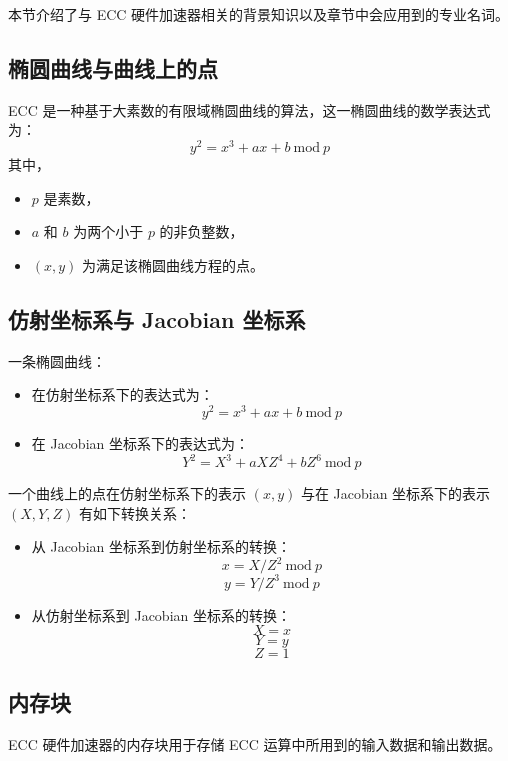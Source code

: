 \documentclass[main\_\_CN.tex]{subfiles}
\begin{document}
本节介绍了与 ECC 硬件加速器相关的背景知识以及章节中会应用到的专业名词。

\subsection{椭圆曲线与曲线上的点}

ECC 是一种基于大素数的有限域椭圆曲线的算法，这一椭圆曲线的数学表达式为：
\[
{y}^{2} = {x}^{3} + {ax} + b \ \textrm{mod}\ p
\]
其中，
\begin{itemize}
    \item $p$ 是素数，
    \item $a$ 和 $b$ 为两个小于 $p$ 的非负整数，
    \item $(x, y)$ 为满足该椭圆曲线方程的点。
\end{itemize}

\subsection{仿射坐标系与 Jacobian 坐标系}

一条椭圆曲线：
\begin{itemize}
    \item 在仿射坐标系下的表达式为：
    \[
    {y}^{2} = {x}^{3} + {ax} + b \ \textrm{mod}\ p
    \]
    \item 在 Jacobian 坐标系下的表达式为：
    \[
    {Y}^{2} = {X}^{3} + {aXZ}^{4} + {bZ}^{6} \ \textrm{mod}\ p
    \]
\end{itemize}

一个曲线上的点在仿射坐标系下的表示 $(x, y)$ 与在 Jacobian 坐标系下的表示 $(X, Y, Z)$ 有如下转换关系：

\begin{itemize}
    \item 从 Jacobian 坐标系到仿射坐标系的转换：
    \[
    x = X / {Z}^2 \ \textrm{mod}\ p
    \]
    \[
    y = Y / {Z}^3 \ \textrm{mod}\ p
    \]
    \item 从仿射坐标系到 Jacobian 坐标系的转换：
    \[ X = x \]
    \[ Y = y \]
    \[ Z = 1\]
\end{itemize}

\subsection{内存块}

ECC 硬件加速器的内存块用于存储 ECC 运算中所用到的输入数据和输出数据。
\end{document}
